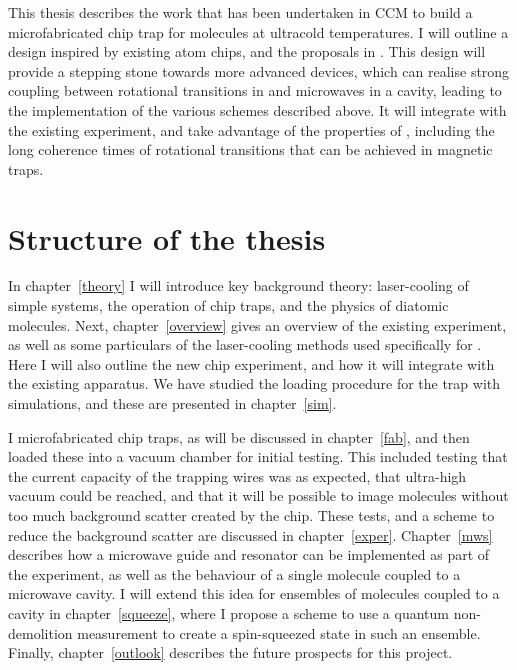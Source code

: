 This thesis describes the work that has been undertaken in CCM to build a
microfabricated chip trap for \CaF{} molecules at ultracold temperatures. I
will outline a design inspired by existing atom chips, and the proposals in
. This design will provide a stepping stone towards more
advanced devices, which can realise strong coupling between rotational
transitions in \CaF{} and microwaves in a cavity, leading to the implementation
of the various schemes described above. It will integrate with the existing
experiment, and take advantage of the properties of \CaF{}, including the long
coherence times of rotational transitions that can be achieved in magnetic
traps.

\section{Structure of the thesis}

In chapter~\ref{theory} I will introduce key background theory: 
laser-cooling of simple systems, the operation of chip traps, and the physics
of diatomic molecules. Next, chapter~\ref{overview} gives an overview of the
existing \CaF{} experiment, as well as some particulars of the laser-cooling
methods used specifically for \CaF{}. Here I will also outline the new chip
experiment, and how it will integrate with the existing apparatus. We have
studied the loading procedure for the trap with simulations, and these are
presented in chapter~\ref{sim}.

I microfabricated chip traps, as will be discussed in chapter~\ref{fab}, and
then loaded these into a vacuum chamber for initial testing. This included
testing that the current capacity of the trapping wires was as expected, that
ultra-high vacuum could be reached, and that it will be possible to image
molecules without too much background scatter created by the chip. These tests,
and a scheme to reduce the background scatter are discussed in
chapter~\ref{exper}. Chapter~\ref{mws} describes how a microwave guide and
resonator can be implemented as part of the experiment, as well as the
behaviour of a single molecule coupled to a microwave cavity. I will extend
this idea for ensembles of molecules coupled to a cavity in
chapter~\ref{squeeze}, where I propose a scheme to use a quantum non-demolition
measurement to create a spin-squeezed state in such an ensemble. Finally,
chapter~\ref{outlook} describes the future prospects for this project.
